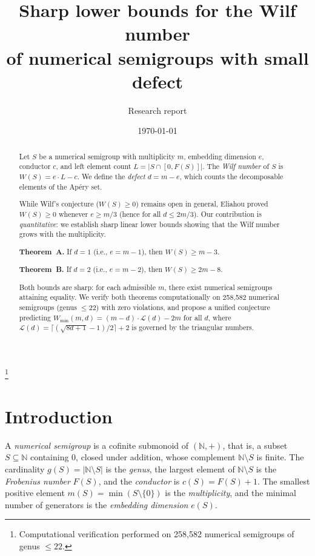 \documentclass[11pt]{amsart}
\theoremstyle{definition}
\theoremstyle{remark}
\newcommand{\NN}{\mathbb{N}}
\begin{document}
\title[Sharp lower bounds for the Wilf number]{Sharp lower bounds for the Wilf number\\of numerical semigroups with small defect}

\author{Research report}

\date{\today}

\thanks{Computational verification performed on 258{,}582 numerical semigroups of genus $\le 22$.}

\begin{abstract}
Let $S$ be a numerical semigroup with multiplicity $m$, embedding dimension $e$,
conductor $c$, and left element count $L = |S \cap [0, F(S)]|$.
The \emph{Wilf number} of $S$ is $W(S) = e \cdot L - c$.
We define the \emph{defect} $d = m - e$, which counts the decomposable elements
of the Ap\'ery set.

While Wilf's conjecture ($W(S) \ge 0$) remains open in general,
Eliahou proved $W(S) \ge 0$ whenever $e \ge m/3$ (hence for all $d \le 2m/3$).
Our contribution is \emph{quantitative}: we establish sharp linear lower bounds
showing that the Wilf number grows with the multiplicity.

\textbf{Theorem~A.} If $d = 1$ (i.e., $e = m - 1$), then $W(S) \ge m - 3$.

\textbf{Theorem~B.} If $d = 2$ (i.e., $e = m - 2$), then $W(S) \ge 2m - 8$.

Both bounds are sharp: for each admissible $m$, there exist numerical semigroups
attaining equality.
We verify both theorems computationally on 258{,}582 numerical semigroups
(genus $\le 22$) with zero violations, and propose a unified conjecture
predicting $W_{\min}(m,d) = (m - d) \cdot \mathcal{L}(d) - 2m$ for all $d$,
where $\mathcal{L}(d) = \lceil (\sqrt{8d+1} - 1)/2 \rceil + 2$
is governed by the triangular numbers.
\end{abstract}

\maketitle
\setcounter{tocdepth}{2}
\tableofcontents

\section{Introduction}\label{sec:intro}

A \emph{numerical semigroup} is a cofinite submonoid of $(\NN, +)$,
that is, a subset $S \subseteq \NN$ containing $0$, closed under addition,
whose complement $\NN \setminus S$ is finite.
The cardinality $g(S) = |\NN \setminus S|$ is the \emph{genus},
the largest element of $\NN \setminus S$ is the \emph{Frobenius number} $F(S)$,
and the \emph{conductor} is $c(S) = F(S) + 1$.
The smallest positive element $m(S) = \min(S \setminus \{0\})$ is the \emph{multiplicity},
and the minimal number of generators is the \emph{embedding dimension} $e(S)$.
\end{document}
